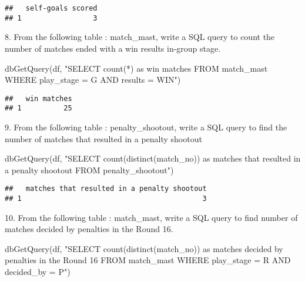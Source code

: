 \documentclass[
]{article}
\newenvironment{Shaded}{\begin{snugshade}}{\end{snugshade}}
\newcommand{\FunctionTok}[1]{\textcolor[rgb]{0.00,0.00,0.00}{#1}}
\newcommand{\NormalTok}[1]{#1}
\newcommand{\StringTok}[1]{\textcolor[rgb]{0.31,0.60,0.02}{#1}}
\begin{document}
\begin{verbatim}
##   self-goals scored
## 1                 3
\end{verbatim}

8. From the following table : match\_mast, write a SQL query to count
the number of matches ended with a win results in-group stage.

\begin{Shaded}
\begin{Highlighting}[]
\FunctionTok{dbGetQuery}\NormalTok{(df, }\StringTok{"SELECT count(*) as \textquotesingle{}win matches\textquotesingle{}}
\StringTok{                FROM match\_mast}
\StringTok{                WHERE play\_stage = \textquotesingle{}G\textquotesingle{} AND results = \textquotesingle{}WIN\textquotesingle{}"}\NormalTok{)}
\end{Highlighting}
\end{Shaded}

\begin{verbatim}
##   win matches
## 1          25
\end{verbatim}

9. From the following table : penalty\_shootout, write a SQL query to
find the number of matches that resulted in a penalty shootout

\begin{Shaded}
\begin{Highlighting}[]
\FunctionTok{dbGetQuery}\NormalTok{(df, }\StringTok{"SELECT count(distinct(match\_no)) as \textquotesingle{}matches that resulted in a penalty shootout\textquotesingle{}}
\StringTok{                FROM penalty\_shootout"}\NormalTok{)}
\end{Highlighting}
\end{Shaded}

\begin{verbatim}
##   matches that resulted in a penalty shootout
## 1                                           3
\end{verbatim}

10. From the following table : match\_mast, write a SQL query to find
number of matches decided by penalties in the Round 16.

\begin{Shaded}
\begin{Highlighting}[]
\FunctionTok{dbGetQuery}\NormalTok{(df, }\StringTok{"SELECT count(distinct(match\_no)) as \textquotesingle{}matches decided by penalties in the Round 16\textquotesingle{}}
\StringTok{                FROM match\_mast}
\StringTok{                WHERE play\_stage = \textquotesingle{}R\textquotesingle{} AND decided\_by = \textquotesingle{}P\textquotesingle{}"}\NormalTok{)}
\end{Highlighting}
\end{Shaded}
\end{document}
